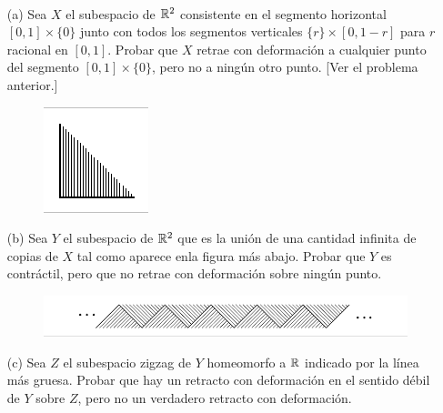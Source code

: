 \documentclass[twoside]{article}
\begin{document}
\begin{ejercicio}{0.6}\
\begin{enumerate}

\item[(a)] Sea $X$ el subespacio de $\mathbb{R}^2$ consistente en el segmento horizontal $[0,1]\times\{0\}$ junto con todos los segmentos verticales $\{r\}\times[0,1-r]$ para $r$ racional en $[0,1]$. Probar que $X$ retrae con deformación a cualquier punto del segmento $[0,1]\times\{0\}$, pero no a ningún otro punto. [Ver el problema anterior.]

\begin{figure}[h!]
\centering
\includegraphics[scale=0.7]{peine}
\end{figure}

\item[(b)] Sea $Y$ el subespacio de $\mathbb{R}^2$ que es la unión de una cantidad infinita de copias de $X$ tal como aparece enla figura más abajo. Probar que $Y$ es contráctil, pero que no retrae con deformación sobre ningún punto.
\begin{figure}[h!]
\centering
\includegraphics[scale=0.7]{peines}
\end{figure}

\item[(c)] Sea $Z$ el subespacio zigzag de $Y$ homeomorfo a $\mathbb{R}$ indicado por la línea más gruesa. Probar que hay un retracto con deformación en el sentido débil de $Y$ sobre $Z$, pero no un verdadero retracto con deformación. 
\end{enumerate}
\end{ejercicio}
\end{document}
